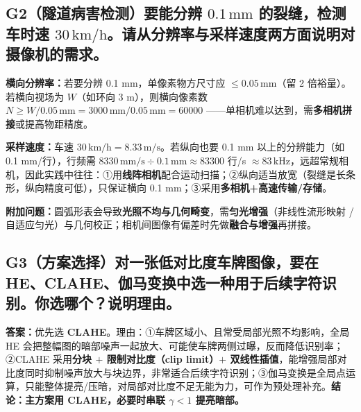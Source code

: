 \subsection*{G2\quad （隧道病害检测）要能分辨 $0.1\,\mathrm{mm}$ 的裂缝，检测车时速 $30\,\mathrm{km/h}$。请从分辨率与采样速度两方面说明对摄像机的需求。}
\textbf{横向分辨率：}若要分辨 0.1 mm，单像素物方尺寸应 $\leq0.05\,\mathrm{mm}$（留 2 倍裕量）。若横向视场为 $W$（如环向 3 m），则横向像素数 $N\geq W/0.05\,\mathrm{mm}=3000\,\mathrm{mm}/0.05\,\mathrm{mm}=60000$ ——单相机难以达到，需\textbf{多相机拼接}或提高物距精度。

\textbf{采样速度：}车速 $30\,\mathrm{km/h}=8.33\,\mathrm{m/s}$。若纵向也要 0.1 mm 以上的分辨能力（如 0.1 mm/行），行频需 $8330\,\mathrm{mm/s}\div0.1\,\mathrm{mm}\approx83300$ 行/s $\approx83\,\mathrm{kHz}$，远超常规相机，因此实践中往往：①用\textbf{线阵相机}配合运动扫描；②纵向适当放宽（裂缝是长条形，纵向精度可低），只保证横向 0.1 mm；③采用\textbf{多相机+高速传输/存储}。

\textbf{附加问题：}圆弧形表会导致\textbf{光照不均与几何畸变}，需\textbf{匀光增强}（非线性流形映射 / 自适应匀光）与几何校正；相机间图像有偏差时先做\textbf{融合与增强}再拼接。

\subsection*{G3\quad （方案选择）对一张低对比度车牌图像，要在 HE、CLAHE、伽马变换中选一种用于后续字符识别。你选哪个？说明理由。}
\textbf{答案：}优先选 \textbf{CLAHE}。理由：①车牌区域小、且常受局部光照不均影响，全局 HE 会把整幅图的暗部噪声一起放大、可能使车牌两侧过曝，反而降低识别率；②CLAHE 采用\textbf{分块 $+$ 限制对比度（clip limit）$+$ 双线性插值}，能增强局部对比度同时抑制噪声放大与块边界，非常适合后续字符识别；③伽马变换是全局点运算，只能整体提亮/压暗，对局部对比度不足无能为力，可作为预处理补充。\textbf{结论：主方案用 CLAHE，必要时串联 $\gamma<1$ 提亮暗部。}

